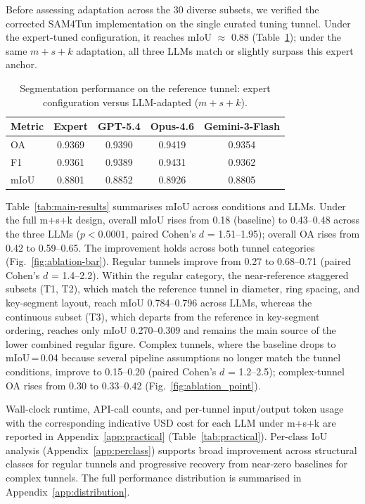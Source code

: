 \documentclass[a4paper,fleqn]{cas-dc}
\begin{document}
{Before assessing adaptation across the 30 diverse subsets, we verified the corrected SAM4Tun implementation on the single curated tuning tunnel. Under the expert-tuned configuration, it reaches mIoU $\approx$ 0.88 (Table~\ref{tab:reference-tunnel}); under the same \mbox{$m+s+k$} adaptation, all three LLMs match or slightly surpass this expert anchor.

\begin{table}[ht]
\caption{Segmentation performance on the reference tunnel: expert configuration versus LLM-adapted (\mbox{$m+s+k$}).}\label{tab:reference-tunnel}
\begin{tabular*}{\tblwidth}{@{} l c c c c @{}}
\toprule
Metric & Expert & GPT-5.4 & Opus-4.6 & Gemini-3-Flash \\
\midrule
OA   & 0.9369 & 0.9390 & 0.9419 & 0.9354 \\
F1   & 0.9361 & 0.9389 & 0.9431 & 0.9362 \\
mIoU & 0.8801 & 0.8852 & 0.8926 & 0.8805 \\
\bottomrule
\end{tabular*}
\end{table}

Table~\ref{tab:main-results} summarises mIoU across conditions and LLMs. Under the full m+s+k design, overall mIoU rises from 0.18 (baseline) to 0.43--0.48 across the three LLMs ($p < 0.0001$, paired Cohen's \mbox{$d$} = 1.51--1.95); overall OA rises from 0.42 to 0.59--0.65. The improvement holds across both tunnel categories (Fig.~\ref{fig:ablation-bar}). Regular tunnels improve from 0.27 to 0.68--0.71 (paired Cohen's \mbox{$d$} = 1.4--2.2). Within the regular category, the near-reference staggered subsets (T1, T2), which match the reference tunnel in diameter, ring spacing, and key-segment layout, reach mIoU 0.784--0.796 across LLMs, whereas the continuous subset (T3), which departs from the reference in key-segment ordering, reaches only mIoU 0.270--0.309 and remains the main source of the lower combined regular figure. Complex tunnels, where the baseline drops to mIoU\,=\,0.04 because several pipeline assumptions no longer match the tunnel conditions, improve to 0.15--0.20 (paired Cohen's \mbox{$d$} = 1.2--2.5); complex-tunnel OA rises from 0.30 to 0.33--0.42 (Fig.~\ref{fig:ablation_point}).

Wall-clock runtime, API-call counts, and per-tunnel input/output token usage with the corresponding indicative USD cost for each LLM under m+s+k are reported in Appendix~\ref{app:practical} (Table~\ref{tab:practical}). Per-class IoU analysis (Appendix~\ref{app:perclass}) supports broad improvement across structural classes for regular tunnels and progressive recovery from near-zero baselines for complex tunnels. The full performance distribution is summarised in Appendix~\ref{app:distribution}. 



}
\end{document}
